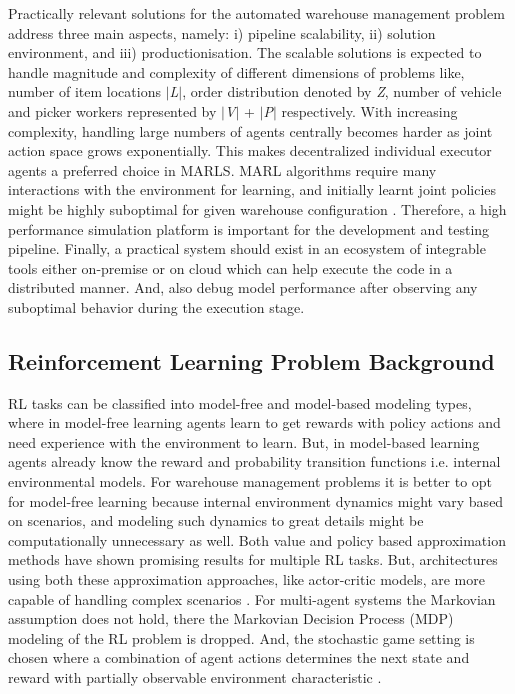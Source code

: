 \documentclass{article}
\begin{document}
Practically relevant solutions for the automated warehouse management problem address three main aspects, namely: i) pipeline scalability, ii) solution environment, and iii) productionisation.
The scalable solutions is expected to handle magnitude and complexity of different dimensions of problems like, number of item locations \textit{$|$L$|$}, order distribution denoted by \textit{Z}, number of vehicle and picker workers represented by \textit{$|$V$|$} + \textit{$|$P$|$} respectively.
With increasing complexity, handling large numbers of agents centrally becomes harder as joint action space grows exponentially.
This makes decentralized individual executor agents a preferred choice in MARLS.
MARL algorithms require many interactions with the environment for learning, and initially learnt joint policies might be highly suboptimal for given warehouse configuration \cite{papoudakis2020benchmarking}.
Therefore, a high performance simulation platform is important for the development and testing pipeline.
Finally, a practical system should exist in an ecosystem of integrable tools either on-premise or on cloud which can help execute the code in a distributed manner.
And, also debug model performance after observing any suboptimal behavior during the execution stage.


\subsection{Reinforcement Learning Problem Background} \label{rl-problem-background}


RL tasks can be classified into model-free and model-based modeling types, where in model-free learning agents learn to get rewards with policy actions and need experience with the environment to learn.
But, in model-based learning agents already know the reward and probability transition functions i.e. internal environmental models.
For warehouse management problems it is better to opt for model-free learning because internal environment dynamics might vary based on scenarios, and modeling such dynamics to great details might be computationally unnecessary as well.
Both value and policy based approximation methods have shown promising results for multiple RL tasks.
But, architectures using both these approximation approaches, like actor-critic models, are more capable of handling complex scenarios \cite{sutton2018reinforcement}.
For multi-agent systems the Markovian assumption does not hold, there the Markovian Decision Process (MDP) modeling of the RL problem is dropped.
And, the stochastic game setting is chosen where a combination of agent actions determines the next state and reward with partially observable environment characteristic \cite{hansen2004dynamic}.
\end{document}

